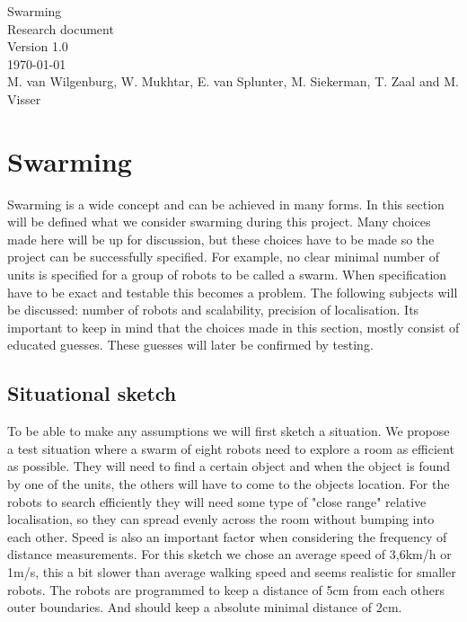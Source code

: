 \documentclass[10pt,a4paper]{article}
\begin{document}
\begin{titlepage}
    \centering
    \vfill
    {\Large

    Swarming\\

   
    {\small Research document}\\
    {\small Version 1.0}\\
    {\small \today}\\
        
        \vskip2cm
        {\small M. van Wilgenburg, W. Mukhtar, E. van Splunter, M. Siekerman, T. Zaal and M. Visser}\\
    }    
    \vfill
    
    \vfill
    \vfill
\end{titlepage}

\newpage

\listoffigures
\newpage

\listoftables
\newpage

\tableofcontents
\newpage

\section{Swarming}
Swarming is a wide concept and can be achieved in many forms. In this section will be defined what we consider swarming during this project. Many choices made here will be up for discussion, but these choices have to be made so the project can be successfully specified. For example, no clear minimal number of units is specified for a group of robots to be called a swarm. When specification have to be exact and testable this becomes a problem. The following subjects will be discussed: number of robots and scalability, precision of localisation. Its important to keep in mind that the choices made in this section, mostly consist of educated guesses. These guesses will later be confirmed by testing.

\subsection{Situational sketch}
To be able to make any assumptions we will first sketch a situation. We propose a test situation where a swarm of eight robots need to explore a room as efficient as possible. They will need to find a certain object and when the object is found by one of the units, the others will have to come to the objects location. For the robots to search efficiently they will need some type of "close range" relative localisation, so they can spread evenly across the room without bumping into each other. Speed is also an important factor when considering the frequency of distance measurements. For this sketch we chose an average speed of 3,6km/h or 1m/s, this a bit slower than average walking speed and seems realistic for smaller robots. The robots are programmed to keep a distance of 5cm from each others outer boundaries. And should keep a absolute minimal distance of 2cm.
\end{document}
